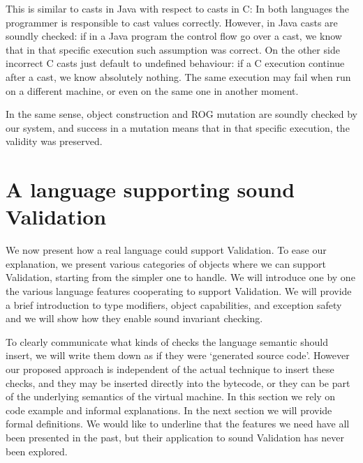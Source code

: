 This is similar to casts in Java with respect to casts in C:
In both languages the programmer is responsible to cast values correctly.
However, in Java casts are soundly checked: if in a Java program the control flow go over a cast,
we know that in that specific
execution such assumption was correct.
On the other side incorrect C casts just default to undefined behaviour:
if a C execution continue after a cast, we know absolutely nothing. The same execution
may fail when run on a different machine, 
or even on the same one in another moment.

In the same sense, object construction and ROG mutation are soundly checked by our system,
and success in a mutation means that in that specific execution, the validity was preserved.




%
%  
% 
%
%
%
%
%
%
%
%
%
%
%
%
%
%
%
%
%



\saveSpace
\section{A language supporting sound Validation}
\label{s:language}
\saveSpace
We now present how a real language could support
Validation. To ease our explanation, we present various categories
of objects where we can support Validation, starting from the simpler one to handle.
We will introduce one by one the various
language features cooperating
to support Validation.%
We will provide a brief introduction to type modifiers, object capabilities, and exception safety and we will show how they enable sound invariant checking.

To clearly communicate what kinds of checks the language semantic should insert,
 we will write them down as if they were `generated source code'. 
However our proposed approach is independent of the actual technique to insert these checks, and they may be inserted directly into the bytecode, or they can be part of the underlying semantics of the virtual machine.
In this section we rely on code example and informal explanations. In the next section we will provide formal definitions.
We would like to underline that the
features we need have all been presented in the past, but their application to sound Validation has never been explored.



